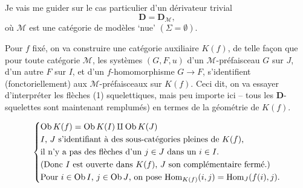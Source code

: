 Je vais me guider sur le cas particulier d'un dérivateur trivial
\[ \mathbf{D} = \mathbf{D}_{\mathcal{M}}, \]
où $\mathcal{M}$ est une catégorie de modèles ‘nue’ $(\Sigma = \emptyset)$.

Pour $f$ fixé, on va construire une catégorie auxiliaire $K(f)$, de telle façon que pour toute catégorie $\mathcal{M}$, les systèmes $(G,F,u)$ d'un $\mathcal{M}$-préfaisceau $G$ sur $J$, d'un autre $F$ sur $I$, et d'un $f$-homomorphisme $G \longrightarrow F$, s'identifient (fonctoriellement) aux $\mathcal{M}$-préfaisceaux sur
$K(f)$. Ceci dit, on va essayer d'interpréter les flèches (1) squelettiques, mais peu importe ici -- tous les $\mathbf{D}$-squelettes sont maintenant remplumés) en termes de la géométrie de $K(f)$. %

\[
\left\{
\begin{aligned}
&\mathrm{Ob}\, K(f) = \mathrm{Ob}\, K(I) \amalg \mathrm{Ob}\, K(J) \qquad \\
&\text{$I$, $J$ s'identifiant à des sous-catégories pleines de $K(f)$,}\\
&\text{il n'y a pas des flèches d'un $j \in J$ dans un $i \in I$.}\\
&\text{(Donc $I$ est ouverte dans $K(f)$, $J$ son complémentaire fermé.)}\\
&\text{Pour $i \in \mathrm{Ob}\, I$, $j \in \mathrm{Ob}\, J$, on pose $\mathrm{Hom}_{K(f)}(i,j) = \mathrm{Hom}_J(f(i),j)$.}
\end{aligned}
\right.
\]

